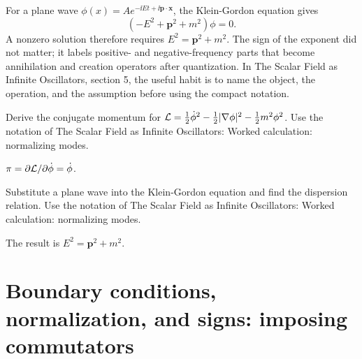 \begin{example}
For a plane wave \(\phi(x)=Ae^{-\ii Et+\ii\bm p\cdot\bm x}\), the Klein-Gordon equation gives
\[
  (-E^2+\bm p^2+m^2)\phi=0.
\]
A nonzero solution therefore requires \(E^2=\bm p^2+m^2\).  The sign of the exponent did not matter; it labels positive- and negative-frequency parts that become annihilation and creation operators after quantization.  In The Scalar Field as Infinite Oscillators, section 5, the useful habit is to name the object, the operation, and the assumption before using the compact notation.
\end{example}



\begin{exercise}
Derive the conjugate momentum for \(\mathcal L=\frac12\dot\phi^2-\frac12|\nabla\phi|^2-\frac12m^2\phi^2\).  Use the notation of The Scalar Field as Infinite Oscillators: Worked calculation: normalizing modes.
\begin{answer}
\(\pi=\partial\mathcal L/\partial\dot\phi=\dot\phi\).
\end{answer}
\end{exercise}

\begin{exercise}
Substitute a plane wave into the Klein-Gordon equation and find the dispersion relation.  Use the notation of The Scalar Field as Infinite Oscillators: Worked calculation: normalizing modes.
\begin{answer}
The result is \(E^2=\bm p^2+m^2\).
\end{answer}
\end{exercise}



\section{Boundary conditions, normalization, and signs: imposing commutators}













